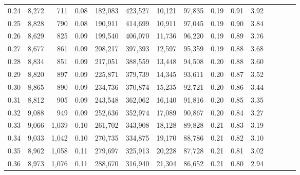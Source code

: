 \begin{tabular}{rrrcrrrrrrrrrrr}
0.24 &   8,272 &    711 &                                       0.08 &  182,083 &  423,527 &   10,121 &   97,835 &  0.19 &  0.91 &                         3.92 \\
0.25 &   8,828 &    790 &                                       0.08 &  190,911 &  414,699 &   10,911 &   97,045 &  0.19 &  0.90 &                         3.84 \\
0.26 &   8,629 &    825 &                                       0.09 &  199,540 &  406,070 &   11,736 &   96,220 &  0.19 &  0.89 &                         3.76 \\
0.27 &   8,677 &    861 &                                       0.09 &  208,217 &  397,393 &   12,597 &   95,359 &  0.19 &  0.88 &                         3.68 \\
0.28 &   8,834 &    851 &                                       0.09 &  217,051 &  388,559 &   13,448 &   94,508 &  0.20 &  0.88 &                         3.60 \\
0.29 &   8,820 &    897 &                                       0.09 &  225,871 &  379,739 &   14,345 &   93,611 &  0.20 &  0.87 &                         3.52 \\
0.30 &   8,865 &    890 &                                       0.09 &  234,736 &  370,874 &   15,235 &   92,721 &  0.20 &  0.86 &                         3.44 \\
0.31 &   8,812 &    905 &                                       0.09 &  243,548 &  362,062 &   16,140 &   91,816 &  0.20 &  0.85 &                         3.35 \\
0.32 &   9,088 &    949 &                                       0.09 &  252,636 &  352,974 &   17,089 &   90,867 &  0.20 &  0.84 &                         3.27 \\
0.33 &   9,066 &  1,039 &                                       0.10 &  261,702 &  343,908 &   18,128 &   89,828 &  0.21 &  0.83 &                         3.19 \\
0.34 &   9,033 &  1,042 &                                       0.10 &  270,735 &  334,875 &   19,170 &   88,786 &  0.21 &  0.82 &                         3.10 \\
0.35 &   8,962 &  1,058 &                                       0.11 &  279,697 &  325,913 &   20,228 &   87,728 &  0.21 &  0.81 &                         3.02 \\
0.36 &   8,973 &  1,076 &                                       0.11 &  288,670 &  316,940 &   21,304 &   86,652 &  0.21 &  0.80 &                         2.94 \\

\end{tabular}
